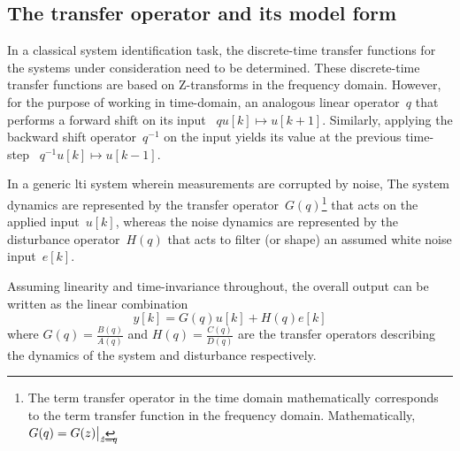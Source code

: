 
\subsection{The transfer operator and its model form}
In a classical system identification  task, the discrete-time transfer functions
for the systems  under consideration need to be  determined. These discrete-time
transfer functions are  based on Z-transforms in the  frequency domain. However,
for the purpose of working in time-domain, an analogous linear operator~$q$ that
performs a  forward shift on  its input \ie~$  {q u[k] \longmapsto  u[k+1]} $.
Similarly, applying the  backward shift operator~$ q^{-1} $  on the input yields
its value at the previous time-step \ie~$ {q^{-1} u[k] \longmapsto u[k-1]}$.



In a generic  \gls{lti} system wherein measurements are corrupted  by noise, The
system  dynamics are  represented by  the transfer  operator~$G(q)$\footnote{The
term  transfer operator  in the  time domain  mathematically corresponds  to the
term  transfer  function  in  the  frequency  domain.  Mathematically,~${G(q)  =
G(z)\bigr\rvert_{\mathrlap{z=q}}}$.}  that  acts  on the  applied  input~$u[k]$,
whereas the  noise dynamics are  represented by the  disturbance operator~$H(q)$
that acts to filter (or shape) an assumed white noise input~$e[k]$.

Assuming linearity and time-invariance throughout, the overall output can be
written as the linear combination
\begin{equation}\label{eq:outputwithsysandnoise}
    y[k] = G(q)u[k] + H(q)e[k]
\end{equation}
where ${G(q) = \frac{B(q)}{A(q)}}$ and ${H(q) = \frac{C(q)}{D(q)}}$ are the transfer
operators describing the dynamics of the system and disturbance respectively.

